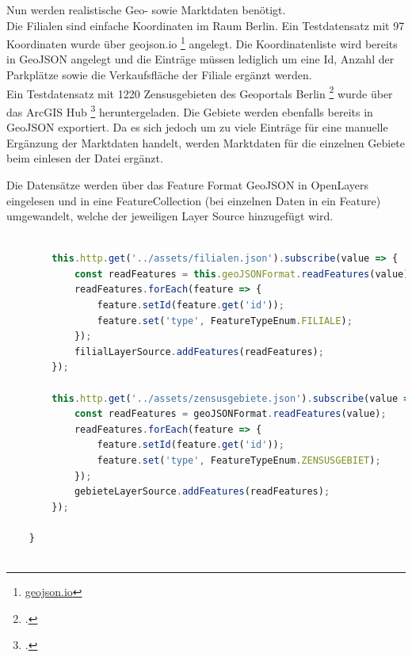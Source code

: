 Nun werden realistische Geo- sowie Marktdaten benötigt.\\
Die Filialen sind einfache Koordinaten im Raum Berlin.
Ein Testdatensatz mit 97 Koordinaten wurde über geojson.io \footnote{\href{geojson.io}{geojson.io}} angelegt.
Die Koordinatenliste wird bereits in GeoJSON angelegt und die Einträge müssen lediglich um eine Id, Anzahl der Parkplätze sowie die Verkaufsfläche der Filiale ergänzt werden.\\
Ein Testdatensatz mit 1220 Zensusgebieten des Geoportals Berlin \footcite{geoportal_berlin} wurde über das ArcGIS Hub \footcite{arcgis_verkehrszellen} heruntergeladen.
Die Gebiete werden ebenfalls bereits in GeoJSON exportiert.
Da es sich jedoch um zu viele Einträge für eine manuelle Ergänzung der Marktdaten handelt, werden Marktdaten für die einzelnen Gebiete beim einlesen der Datei ergänzt.

Die Datensätze werden über das Feature Format GeoJSON in OpenLayers eingelesen und in eine FeatureCollection (bei einzelnen Daten in ein Feature) umgewandelt, welche der jeweiligen Layer Source hinzugefügt wird.

\begin{lstlisting}[language=JavaScript]

		this.http.get('../assets/filialen.json').subscribe(value => {
			const readFeatures = this.geoJSONFormat.readFeatures(value);
			readFeatures.forEach(feature => {
				feature.setId(feature.get('id'));
				feature.set('type', FeatureTypeEnum.FILIALE);
			});
			filialLayerSource.addFeatures(readFeatures);
		});

		this.http.get('../assets/zensusgebiete.json').subscribe(value => {
			const readFeatures = geoJSONFormat.readFeatures(value);
			readFeatures.forEach(feature => {
				feature.setId(feature.get('id'));
				feature.set('type', FeatureTypeEnum.ZENSUSGEBIET);
			});
			gebieteLayerSource.addFeatures(readFeatures);
		});
		
	}		
	
\end{lstlisting}

